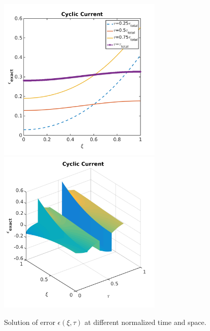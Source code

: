 \documentclass[]{article}
\begin{document}
\begin{figure}[h]
    \centering
    \includegraphics[trim = 0in 0in 0in 0in, clip, width=0.7\textwidth]{figures/error2d_exact_cycl.png}
    \\
    \includegraphics[trim = 0in 0in 0in 0in, clip, width=0.7\textwidth]{figures/error3d_exact_cycl.png}       
    \caption{Solution of error $\epsilon(\xi,\tau)$ at different normalized time and space.}
    \label{fig:error_2d_cycl}
\end{figure}
\end{document}
